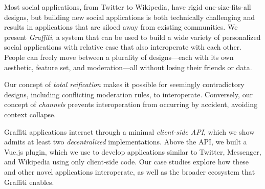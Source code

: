 
Most social applications, from Twitter to Wikipedia,
have rigid one-size-fits-all designs, but building new social applications
is both technically challenging and results in
applications that are siloed away from existing communities.
We present \emph{Graffiti}, a system that can be used
to build a wide variety of personalized social applications
with relative ease that also interoperate with each other. People can freely move between
a plurality of designs---each with its own aesthetic, feature set,
and moderation---all without losing their friends or data.

Our concept of \emph{total reification} makes it possible
for seemingly contradictory designs, including conflicting
moderation rules, to interoperate.
Conversely, our concept of \emph{channels}
prevents interoperation from occurring by accident, avoiding context collapse.

Graffiti applications interact through a minimal \emph{client-side API},
which we show admits at least two \emph{decentralized} implementations.
Above the API, we built a Vue.js plugin, which we use to
develop applications similar to Twitter, Messenger, and Wikipedia
using only client-side code.
Our case studies explore how these and other novel applications interoperate,
as well as the broader ecosystem that Graffiti enables.
